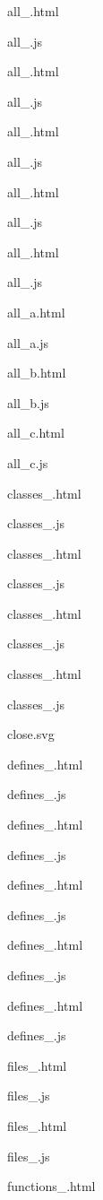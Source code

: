 \begin{DoxyItemize}
\begin{DoxyItemize}
\begin{DoxyItemize}
\begin{DoxyItemize}
\item all\+\_.\+html
\item all\+\_.\+js
\item all\+\_.\+html
\item all\+\_.\+js
\item all\+\_.\+html
\item all\+\_.\+js
\item all\+\_.\+html
\item all\+\_.\+js
\item all\+\_.\+html
\item all\+\_.\+js
\item all\+\_\+a.\+html
\item all\+\_\+a.\+js
\item all\+\_\+b.\+html
\item all\+\_\+b.\+js
\item all\+\_\+c.\+html
\item all\+\_\+c.\+js
\item classes\+\_.\+html
\item classes\+\_.\+js
\item classes\+\_.\+html
\item classes\+\_.\+js
\item classes\+\_.\+html
\item classes\+\_.\+js
\item classes\+\_.\+html
\item classes\+\_.\+js
\item close.\+svg
\item defines\+\_.\+html
\item defines\+\_.\+js
\item defines\+\_.\+html
\item defines\+\_.\+js
\item defines\+\_.\+html
\item defines\+\_.\+js
\item defines\+\_.\+html
\item defines\+\_.\+js
\item defines\+\_.\+html
\item defines\+\_.\+js
\item files\+\_.\+html
\item files\+\_.\+js
\item files\+\_.\+html
\item files\+\_.\+js
\item functions\+\_.\+html

\end{DoxyItemize}
\end{DoxyItemize}
\end{DoxyItemize}
\end{DoxyItemize}
